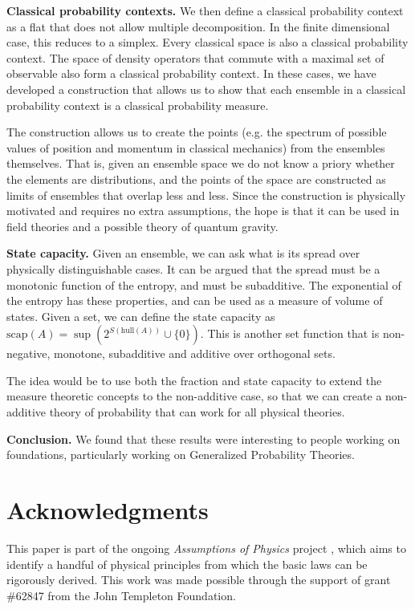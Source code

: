 \documentclass[10pt,twocolumn, nofootinbib]{revtex4-2}
\newcommand\hull{\mathrm{hull}}
\newcommand\capacity{\mathrm{scap}}
\begin{document}
\textbf{Classical probability contexts.} We then define a classical probability context as a flat that does not allow multiple decomposition. In the finite dimensional case, this reduces to a simplex. Every classical space is also a classical probability context. The space of density operators that commute with a maximal set of observable also form a classical probability context. In these cases, we have developed a construction that allows us to show that each ensemble in a classical probability context is a classical probability measure.

The construction allows us to create the points (e.g. the spectrum of possible values of position and momentum in classical mechanics) from the ensembles themselves. That is, given an ensemble space we do not know a priory whether the elements are distributions, and the points of the space are constructed as limits of ensembles that overlap less and less. Since the construction is physically motivated and requires no extra assumptions, the hope is that it can be used in field theories and a possible theory of quantum gravity.

\textbf{State capacity.} Given an ensemble, we can ask what is its spread over physically distinguishable cases. It can be argued that the spread must be a monotonic function of the entropy, and must be subadditive. The exponential of the entropy has these properties, and can be used as a measure of volume of states. Given a set, we can define the state capacity as $\capacity(A) = \sup(2^{S(\hull(A))}\cup\{0\})$. This is another set function that is non-negative, monotone, subadditive and additive over orthogonal sets.

The idea would be to use both the fraction and state capacity to extend the measure theoretic concepts to the non-additive case, so that we can create a non-additive theory of probability that can work for all physical theories.

\textbf{Conclusion.} We found that these results were interesting to people working on foundations, particularly working on Generalized Probability Theories.

\section*{Acknowledgments}
This paper is part of the ongoing \textit{Assumptions of Physics} project \cite{aop-book}, which aims to identify a handful of physical principles from which the basic laws can be rigorously derived. This work was made possible through the support of grant \#62847 from the John Templeton Foundation.




\newcommand{\pj}[1] {\underbar{$#1$}}
\end{document}
